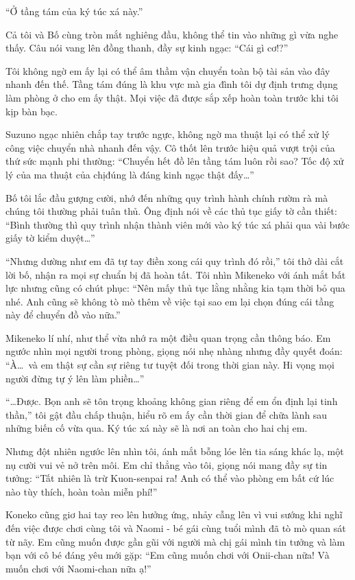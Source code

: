 ﻿\documentclass[../main.tex]{subfiles}
\begin{document}
``Ở tầng tám của ký túc xá này.''

Cả tôi và Bố cùng tròn mắt nghiêng đầu, không thể tin vào những gì vừa nghe thấy. Câu nói vang lên đồng thanh, đầy sự kinh ngạc: ``Cái gì cơ!?''

Tôi không ngờ em ấy lại có thể âm thầm vận chuyển toàn bộ tài sản vào đây nhanh đến thế. Tầng tám đúng là khu vực mà gia đình tôi dự định trưng dụng làm phòng ở cho em ấy thật. Mọi việc đã được sắp xếp hoàn toàn trước khi tôi kịp bàn bạc.

Suzuno ngạc nhiên chắp tay trước ngực, không ngờ ma thuật lại có thể xử lý công việc chuyển nhà nhanh đến vậy. Cô thốt lên trước hiệu quả vượt trội của thứ sức mạnh phi thường: ``Chuyển hết đồ lên tầng tám luôn rồi sao? Tốc độ xử lý của ma thuật của chịđúng là đáng kinh ngạc thật đấy\dots''

Bố tôi lắc đầu gượng cười, nhớ đến những quy trình hành chính rườm rà mà chúng tôi thường phải tuân thủ. Ông định nói về các thủ tục giấy tờ cần thiết: ``Bình thường thì quy trình nhận thành viên mới vào ký túc xá phải qua vài bước giấy tờ kiểm duyệt\dots''

``Nhưng dường như em đã tự tay điền xong cái quy trình đó rồi,'' tôi thở dài cắt lời bố, nhận ra mọi sự chuẩn bị đã hoàn tất. Tôi nhìn Mikeneko với ánh mắt bất lực nhưng cũng có chút phục: ``Nên mấy thủ tục lằng nhằng kia tạm thời bỏ qua nhé. Anh cũng sẽ không tò mò thêm về việc tại sao em lại chọn đúng cái tầng này để chuyển đồ vào nữa.''

Mikeneko lí nhí, như thể vừa nhớ ra một điều quan trọng cần thông báo. Em ngước nhìn mọi người trong phòng, giọng nói nhẹ nhàng nhưng đầy quyết đoán: ``À\dots\ và em thật sự cần sự riêng tư tuyệt đối trong thời gian này. Hi vọng mọi người đừng tự ý lên làm phiền\dots''

``\dots Được. Bọn anh sẽ tôn trọng khoảng không gian riêng để em ổn định lại tinh thần,'' tôi gật đầu chấp thuận, hiểu rõ em ấy cần thời gian để chữa lành sau những biến cố vừa qua. Ký túc xá này sẽ là nơi an toàn cho hai chị em.

Nhưng đột nhiên ngước lên nhìn tôi, ánh mắt bỗng lóe lên tia sáng khác lạ, một nụ cười vui vẻ nở trên môi. Em chỉ thẳng vào tôi, giọng nói mang đầy sự tin tưởng: ``Tất nhiên là trừ Kuon-senpai ra! Anh có thể vào phòng em bất cứ lúc nào tùy thích, hoàn toàn miễn phí!''

Koneko cũng giơ hai tay reo lên hưởng ứng, nhảy cẫng lên vì vui sướng khi nghĩ đến việc được chơi cùng tôi và Naomi - bé gái cùng tuổi mình đã tò mò quan sát từ nãy. Em cũng muốn được gần gũi với người mà chị gái mình tin tưởng và làm bạn với cô bé đáng yêu mới gặp: ``Em cũng muốn chơi với Onii-chan nữa! Và muốn chơi với Naomi-chan nữa ạ!''
\end{document}
